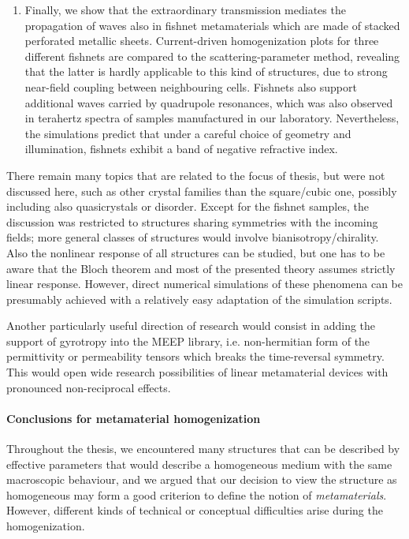 \begin{enumerate}
{} 
\item{Finally, we show that the extraordinary transmission mediates the propagation of waves also in fishnet metamaterials which are made of stacked perforated metallic sheets. Current-driven homogenization plots for three different fishnets are compared to the scattering-parameter method, revealing  that the latter is hardly applicable to this kind of structures, due to strong near-field coupling between neighbouring cells. Fishnets also support additional waves carried by quadrupole resonances, which was also observed in terahertz spectra of samples manufactured in our laboratory. Nevertheless, the simulations predict that under a careful choice of geometry and illumination, fishnets exhibit a band of negative refractive index. 
}
\end{enumerate}
There remain many topics that are related to the focus of thesis, but were not discussed here, such as other crystal families than the square/cubic one, possibly including also quasicrystals or disorder. Except for the fishnet samples, the discussion was restricted to structures sharing symmetries with the incoming fields; more general classes of structures would involve bianisotropy/chirality. Also the nonlinear response of all structures can be studied, but one has to be aware that the Bloch theorem and most of the presented theory assumes strictly linear response. However, direct numerical simulations of these phenomena can be presumably  achieved with a relatively easy adaptation of the simulation scripts.

Another particularly useful direction of research would consist in adding the support of gyrotropy into the MEEP library, i.e. non-hermitian form of the permittivity or permeability tensors which breaks the time-reversal symmetry. This would open wide research possibilities of linear metamaterial devices with pronounced non-reciprocal effects.

\paragraph{Conclusions for metamaterial homogenization}
Throughout the thesis, we encountered many structures that can be described by effective parameters that would describe a homogeneous medium with the same macroscopic behaviour, and we argued that our decision to view the structure as homogeneous may form a good criterion to define the notion of \textit{metamaterials}. However, different kinds of technical or conceptual difficulties arise during the homogenization.

